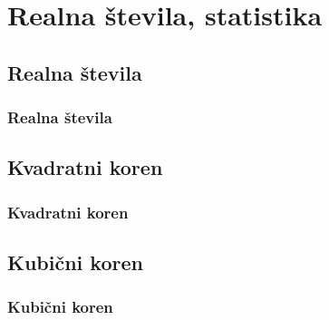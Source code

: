 \section{Realna števila, statistika}

\begin{frame}
    \sectionpage
\end{frame}

\begin{frame}
\end{frame}

    \subsection{Realna števila}

        \begin{frame}
            \frametitle{Realna števila}
        \end{frame}

    \subsection{Kvadratni koren}

        \begin{frame}
            \frametitle{Kvadratni koren}
        \end{frame}

    \subsection{Kubični koren}

        \begin{frame}
            \frametitle{Kubični koren}
        \end{frame}





